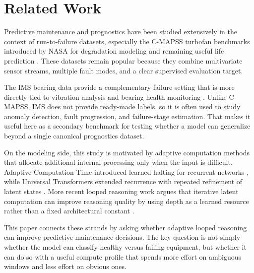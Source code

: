\section{Related Work}
Predictive maintenance and prognostics have been studied extensively in the context of run-to-failure datasets, especially the C-MAPSS turbofan benchmarks introduced by NASA for degradation modeling and remaining useful life prediction \cite{Saxena2008CMAPSS,Ramasso2014CMAPSS}. These datasets remain popular because they combine multivariate sensor streams, multiple fault modes, and a clear supervised evaluation target.

The IMS bearing data provide a complementary failure setting that is more directly tied to vibration analysis and bearing health monitoring \cite{NASAIMSBearings}. Unlike C-MAPSS, IMS does not provide ready-made labels, so it is often used to study anomaly detection, fault progression, and failure-stage estimation. That makes it useful here as a secondary benchmark for testing whether a model can generalize beyond a single canonical prognostics dataset.

On the modeling side, this study is motivated by adaptive computation methods that allocate additional internal processing only when the input is difficult. Adaptive Computation Time introduced learned halting for recurrent networks \cite{Graves2016ACT}, while Universal Transformers extended recurrence with repeated refinement of latent states \cite{Dehghani2018UniversalTransformers}. More recent looped reasoning work argues that iterative latent computation can improve reasoning quality by using depth as a learned resource rather than a fixed architectural constant \cite{Zhu2025Ouro, Banino2021PonderNet}.

This paper connects these strands by asking whether adaptive looped reasoning can improve predictive maintenance decisions. The key question is not simply whether the model can classify healthy versus failing equipment, but whether it can do so with a useful compute profile that spends more effort on ambiguous windows and less effort on obvious ones.
